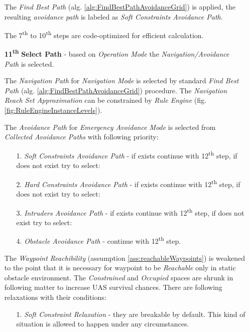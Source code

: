 \begin{itemize}
    The \emph{Find Best Path} (alg. \ref{alg:FindBestPathAvoidanceGrid}) is applied, the resulting \emph{avoidance path} is labeled as \emph{Soft Constraints Avoidance Path}.
    
    \begin{note}
        The 7\textsuperscript{th} to 10\textsuperscript{th} steps are code-optimized for efficient calculation.
    \end{note}
    
    \item[\textbf{11\textsuperscript{th}}] \textbf{Select Path} -  based on \emph{Operation Mode} the \emph{Navigation/Avoidance Path} is selected.
    
    The \emph{Navigation Path} for \emph{Navigation Mode} is selected by standard \emph{Find Best Path} (alg. \ref{alg:FindBestPathAvoidanceGrid}) procedure. The \emph{Navigation Reach Set Approximation} can be constrained by \emph{Rule Engine} (fig. \ref{fig:RuleEngineInstanceLevels}).
    
    The \emph{Avoidance Path} for \emph{Emergency Avoidance Mode} is selected from \emph{Collected Avoidance Paths} with following priority:
    \begin{itemize}
        \item[1.] \emph{Soft Constraints Avoidance Path} - if exists continue with 12\textsuperscript{th} step, if does not exist try to select:
        
        \item[2.] \emph{Hard Constraints Avoidance Path} - if exists continue with 12\textsuperscript{th} step, if does not exist try to select:
        
        \item[3.] \emph{Intruders Avoidance Path} - if exists continue with 12\textsuperscript{th} step, if does not exist try to select:
        
        \item[4.] \emph{Obstacle Avoidance Path} - continue with 12\textsuperscript{th} step.
    \end{itemize}
    \begin{note}
        The \emph{Waypoint Reachibility} (assumption \ref{ass:reachableWaypoints}) is weakened to the point that it is necessary for waypoint to be \emph{Reachable} only in static obstacle environment. The \emph{Constrained} and \emph{Occupied} spaces are shrunk in following matter to increase UAS survival chances. There are following relaxations with their conditions:
        \begin{itemize}
            \item[1.] \emph{Soft Constraint Relaxation} - they are breakable by default.  This kind of situation is allowed to happen under any circumstances. 
            

\end{itemize}
\end{note}
\end{itemize}
